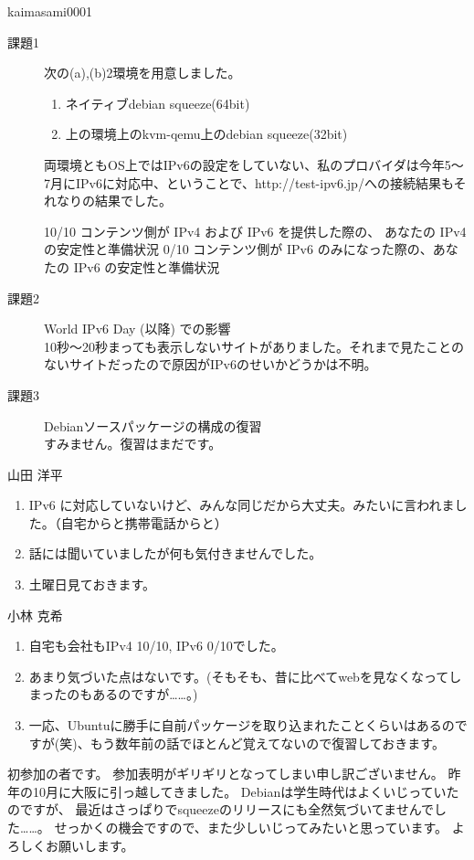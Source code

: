 \documentclass[mingoth,a4paper]{jsarticle}
\begin{document}
\begin{prework}{ kaimasami0001 }
  \begin{description}
  \item[課題1] 次の(a),(b)2環境を用意しました。
    \def\theenumi{(\alph{enumi})}
    \begin{enumerate}
    \item ネイティブdebian squeeze(64bit)
    \item 上の環境上のkvm-qemu上のdebian squeeze(32bit)
    \end{enumerate}
    \def\theenumi{\arabic{enumi}}
両環境ともOS上ではIPv6の設定をしていない、私のプロバイダは今年5〜7月にIPv6に対応中、ということで、http://test-ipv6.jp/への接続結果もそれなりの結果でした。
\begin{commandline}
  10/10  コンテンツ側が IPv4 および IPv6 を提供した際の、
         あなたの IPv4 の安定性と準備状況
   0/10  コンテンツ側が IPv6 のみになった際の、あなたの
         IPv6 の安定性と準備状況
\end{commandline}
\item[課題2] World IPv6 Day (以降) での影響\\
10秒〜20秒まっても表示しないサイトがありました。それまで見たことのないサイトだったので原因がIPv6のせいかどうかは不明。
\item[課題3] Debianソースパッケージの構成の復習\\
  すみません。復習はまだです。
  \end{description}
\end{prework}

\begin{prework}{ 山田 洋平 }
  \begin{enumerate}
  \item IPv6 に対応していないけど、みんな同じだから大丈夫。みたいに言われました。（自宅からと携帯電話からと）
  \item 話には聞いていましたが何も気付きませんでした。
  \item 土曜日見ておきます。
  \end{enumerate}
\end{prework}

\begin{prework}{ 小林 克希 }
  \begin{enumerate}
  \item 自宅も会社もIPv4 10/10, IPv6 0/10でした。
  \item あまり気づいた点はないです。(そもそも、昔に比べてwebを見なくなってしまったのもあるのですが……。)
  \item 一応、Ubuntuに勝手に自前パッケージを取り込まれたことくらいはあるのですが(笑)、もう数年前の話でほとんど覚えてないので復習しておきます。
  \end{enumerate}
初参加の者です。
参加表明がギリギリとなってしまい申し訳ございません。
昨年の10月に大阪に引っ越してきました。
Debianは学生時代はよくいじっていたのですが、
最近はさっぱりでsqueezeのリリースにも全然気づいてませんでした……。
せっかくの機会ですので、また少しいじってみたいと思っています。
よろしくお願いします。
\end{prework}
\end{document}
